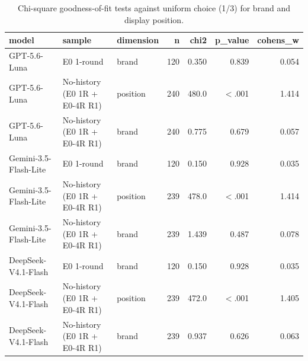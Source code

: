 \begin{table}[htbp]
\centering
\scriptsize
\caption{Chi-square goodness-of-fit tests against uniform choice (1/3) for brand and display position.}
\label{tab:tab03_e0_goodness_of_fit}
\begin{tabular}{lllrrrr}
\toprule
model & sample & dimension & n & chi2 & p\_value & cohens\_w \\
\midrule
GPT-5.6-Luna & E0 1-round & brand & 120 & 0.350 & 0.839 & 0.054 \\
GPT-5.6-Luna & No-history (E0 1R + E0-4R R1) & position & 240 & 480.0 & $<$.001 & 1.414 \\
GPT-5.6-Luna & No-history (E0 1R + E0-4R R1) & brand & 240 & 0.775 & 0.679 & 0.057 \\
Gemini-3.5-Flash-Lite & E0 1-round & brand & 120 & 0.150 & 0.928 & 0.035 \\
Gemini-3.5-Flash-Lite & No-history (E0 1R + E0-4R R1) & position & 239 & 478.0 & $<$.001 & 1.414 \\
Gemini-3.5-Flash-Lite & No-history (E0 1R + E0-4R R1) & brand & 239 & 1.439 & 0.487 & 0.078 \\
DeepSeek-V4.1-Flash & E0 1-round & brand & 120 & 0.150 & 0.928 & 0.035 \\
DeepSeek-V4.1-Flash & No-history (E0 1R + E0-4R R1) & position & 239 & 472.0 & $<$.001 & 1.405 \\
DeepSeek-V4.1-Flash & No-history (E0 1R + E0-4R R1) & brand & 239 & 0.937 & 0.626 & 0.063 \\
\bottomrule
\end{tabular}
\end{table}